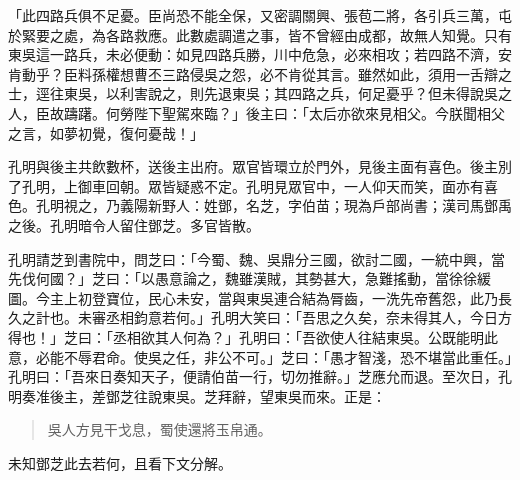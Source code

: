 「此四路兵俱不足憂。臣尚恐不能全保，又密調關興、張苞二將，各引兵三萬，屯於緊要之處，為各路救應。此數處調遣之事，皆不曾經由成都，故無人知覺。只有東吳這一路兵，未必便動：如見四路兵勝，川中危急，必來相攻；若四路不濟，安肯動乎？臣料孫權想曹丕三路侵吳之怨，必不肯從其言。雖然如此，須用一舌辯之士，逕往東吳，以利害說之，則先退東吳；其四路之兵，何足憂乎？但未得說吳之人，臣故躊躇。何勞陛下聖駕來臨？」後主曰：「太后亦欲來見相父。今朕聞相父之言，如夢初覺，復何憂哉！」

孔明與後主共飲數杯，送後主出府。眾官皆環立於門外，見後主面有喜色。後主別了孔明，上御車回朝。眾皆疑惑不定。孔明見眾官中，一人仰天而笑，面亦有喜色。孔明視之，乃義陽新野人：姓鄧，名芝，字伯苗；現為戶部尚書；漢司馬鄧禹之後。孔明暗令人留住鄧芝。多官皆散。

孔明請芝到書院中，問芝曰：「今蜀、魏、吳鼎分三國，欲討二國，一統中興，當先伐何國？」芝曰：「以愚意論之，魏雖漢賊，其勢甚大，急難搖動，當徐徐緩圖。今主上初登寶位，民心未安，當與東吳連合結為脣齒，一洗先帝舊怨，此乃長久之計也。未審丞相鈞意若何。」孔明大笑曰：「吾思之久矣，奈未得其人，今日方得也！」芝曰：「丞相欲其人何為？」孔明曰：「吾欲使人往結東吳。公既能明此意，必能不辱君命。使吳之任，非公不可。」芝曰：「愚才智淺，恐不堪當此重任。」孔明曰：「吾來日奏知天子，便請伯苗一行，切勿推辭。」芝應允而退。至次日，孔明奏准後主，差鄧芝往說東吳。芝拜辭，望東吳而來。正是：

\begin{quote}
吳人方見干戈息，蜀使還將玉帛通。
\end{quote}

未知鄧芝此去若何，且看下文分解。
